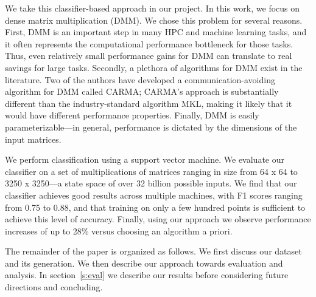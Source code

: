 We take this classifier-based approach in our project.
In this work, we focus on dense matrix multiplication (DMM).
We chose this problem for several reasons.
First, DMM is an important step in many HPC and machine learning tasks, and it often represents the computational performance bottleneck for those tasks.
Thus, even relatively small performance gains for DMM can translate to real savings for large tasks.
Secondly, a plethora of algorithms for DMM exist in the literature.
Two of the authors have developed a communication-avoiding algorithm for DMM called CARMA; CARMA's approach is substantially different than the industry-standard algorithm MKL, making it likely that it would have different performance properties.
Finally, DMM is easily parameterizable---in general, performance is dictated by the dimensions of the input matrices.

We perform classification using a support vector machine.
We evaluate our classifier on a set of multiplications of matrices ranging in size from 64 x 64 to 3250 x 3250---a state space of over 32 billion possible inputs.
We find that our classifier achieves good results across multiple machines, with F1 scores ranging from 0.75 to 0.88, and that training on only a few hundred points is sufficient to achieve this level of accuracy.
Finally, using our approach we observe performance increases of up to 28\% versus choosing an algorithm a priori.

The remainder of the paper is organized as follows.
We first discuss our dataset and its generation.
We then describe our approach towards evaluation and analysis.
In section~\ref{s:eval} we describe our results before considering future directions and concluding.
